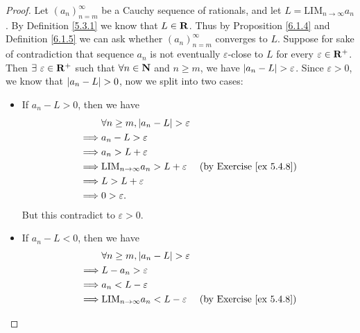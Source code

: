 \begin{proof}
    Let \((a_n)_{n = m}^\infty\) be a Cauchy sequence of rationals, and let \(L = \text{LIM}_{n \to \infty} a_n\).
    By Definition \ref{5.3.1} we know that \(L \in \mathbf{R}\).
    Thus by Proposition \ref{6.1.4} and Definition \ref{6.1.5} we can ask whether \((a_n)_{n = m}^\infty\) converges to \(L\).
    Suppose for sake of contradiction that sequence \(a_n\) is not eventually \(\varepsilon\)-close to \(L\) for every \(\varepsilon \in \mathbf{R}^+\).
    Then \(\exists\ \varepsilon \in \mathbf{R}^+\) such that \(\forall n \in \mathbf{N}\) and \(n \geq m\), we have \(\left\lvert a_n - L\right\rvert > \varepsilon\).
    Since \(\varepsilon > 0\), we know that \(\left\lvert a_n - L\right\rvert > 0\), now we split into two cases:
    \begin{itemize}
        \item If \(a_n - L > 0\), then we have
              \begin{align*}
                           & \forall n \geq m, \left\lvert a_n - L\right\rvert > \varepsilon                                         \\
                  \implies & a_n - L > \varepsilon                                                                 \\
                  \implies & a_n > L + \varepsilon                                                                 \\
                  \implies & \text{LIM}_{n \to \infty} a_n > L + \varepsilon & \text{(by Exercise \ref{ex 5.4.8})} \\
                  \implies & L > L + \varepsilon                                                                   \\
                  \implies & 0 > \varepsilon.
              \end{align*}
              But this contradict to \(\varepsilon > 0\).
        \item If \(a_n - L < 0\), then we have
              \begin{align*}
                           & \forall n \geq m, \abs{a_n - L} > \varepsilon                                         \\
                  \implies & L - a_n > \varepsilon                                                                 \\
                  \implies & a_n < L - \varepsilon                                                                 \\
                  \implies & \text{LIM}_{n \to \infty} a_n < L - \varepsilon & \text{(by Exercise \ref{ex 5.4.8})} \\

\end{align*}
\end{itemize}
\end{proof}
